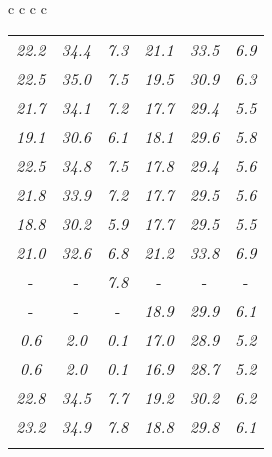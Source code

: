 \documentclass[sigplan,screen]{acmart}
\makeatletter
\newcommand{\ccell}[3][]{%
  \kern-\fboxsep
  \if\relax\detokenize{#1}\relax
    \expandafter\@firstoftwo
  \else
    \expandafter\@secondoftwo
  \fi
  {\colorbox{#2}}%
  {\colorbox[#1]{#2}}%
  {#3}\kern-\fboxsep
}
\makeatother
\begin{document}
\begin{table*}
\begin{tabular}{c c c c}
\begin{tabular}{c c c c c c}
      \textit{22.2} & \textit{34.4} & \textit{7.3} & \textit{21.1} & \textit{33.5} & \textit{6.9} \\
      \textit{22.5} & \textit{35.0} & \textit{7.5} & \textit{19.5} & \textit{30.9} & \textit{6.3} \\
      \textit{21.7} & \textit{34.1} & \textit{7.2} & \textit{17.7} & \textit{29.4} & \textit{5.5} \\
      \textit{19.1} & \textit{30.6} & \textit{6.1} & \textit{18.1} & \textit{29.6} & \textit{5.8} \\
      \textit{22.5} & \textit{34.8} & \textit{7.5} & \textit{17.8} & \textit{29.4} & \textit{5.6} \\
      \textit{21.8} & \textit{33.9} & \textit{7.2} & \textit{17.7} & \textit{29.5} & \textit{5.6} \\
      \textit{18.8} & \textit{30.2} & \textit{5.9} & \textit{17.7} & \textit{29.5} & \textit{5.5} \\
      \textit{21.0} & \textit{32.6} & \textit{6.8} & \textit{21.2} & \textit{33.8} & \textit{6.9} \\
       \ccell[gray]{0.9}{\textit{23.4}} &  \ccell[gray]{0.9}{\textit{35.4}} & \textit{7.8} &  \ccell[gray]{0.9}{\textit{21.8}} &  \ccell[gray]{0.9}{\textit{34.0}} &  \ccell[gray]{0.9}{\textit{7.2}} \\
       \ccell[gray]{0.9}{\textit{23.4}} &  \ccell[gray]{0.9}{\textit{35.4}} &  \ccell[gray]{0.9}{\textit{7.9}} & \textit{18.9} & \textit{29.9} & \textit{6.1} \\
      \textit{0.6} & \textit{2.0} & \textit{0.1} & \textit{17.0} & \textit{28.9} & \textit{5.2} \\
      \textit{0.6} & \textit{2.0} & \textit{0.1} & \textit{16.9} & \textit{28.7} & \textit{5.2} \\
      \textit{22.8} & \textit{34.5} & \textit{7.7} & \textit{19.2} & \textit{30.2} & \textit{6.2} \\
      \textit{23.2} & \textit{34.9} & \textit{7.8} & \textit{18.8} & \textit{29.8} & \textit{6.1} \\
      
       
      
      \rule{0pt}{4ex}    
      
      
      

\end{tabular}
\end{tabular}
\end{table*}
\end{document}

